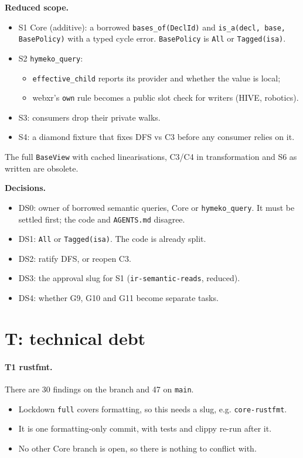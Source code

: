 \documentclass[11pt,a4paper]{article}
\newcommand{\code}[1]{\texttt{#1}}
\begin{document}
\textbf{Reduced scope.}
\begin{itemize}[nosep]
\item S1 Core (additive): a borrowed \code{bases\_of(DeclId)} and \code{is\_a(decl, base, BasePolicy)} with a
  typed cycle error. \code{BasePolicy} is \code{All} or \code{Tagged(isa)}.
\item S2 \code{hymeko\_query}:
  \begin{itemize}[nosep]
  \item \code{effective\_child} reports its provider and whether the value is local;
  \item webxr's \code{own} rule becomes a public slot check for writers (HIVE, robotics).
  \end{itemize}
\item S3: consumers drop their private walks.
\item S4: a diamond fixture that fixes DFS vs C3 before any consumer relies on it.
\end{itemize}
The full \code{BaseView} with cached linearisations, C3/C4 in transformation and S6 as written are obsolete.

\textbf{Decisions.}
\begin{itemize}[nosep]
\item DS0: owner of borrowed semantic queries, Core or \code{hymeko\_query}. It must be settled first; the
  code and \code{AGENTS.md} disagree.
\item DS1: \code{All} or \code{Tagged(isa)}. The code is already split.
\item DS2: ratify DFS, or reopen C3.
\item DS3: the approval slug for S1 (\code{ir-semantic-reads}, reduced).
\item DS4: whether G9, G10 and G11 become separate tasks.
\end{itemize}

\section{T: technical debt}
\paragraph{T1 rustfmt.} There are 30 findings on the branch and 47 on \code{main}.
\begin{itemize}[nosep]
\item Lockdown \code{full} covers formatting, so this needs a slug, e.g. \code{core-rustfmt}.
\item It is one formatting-only commit, with tests and clippy re-run after it.
\item No other Core branch is open, so there is nothing to conflict with.
\end{itemize}
\end{document}
